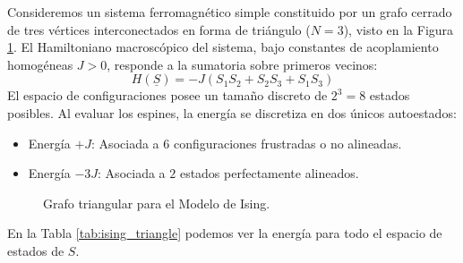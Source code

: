 \begin{ejemplo}
Consideremos un sistema ferromagnético simple constituido por un grafo cerrado de tres vértices interconectados en forma de triángulo ($N=3$), visto en la Figura \ref{fig:ising_triangle}. El Hamiltoniano macroscópico del sistema, bajo constantes de acoplamiento homogéneas $J > 0$, responde a la sumatoria sobre primeros vecinos:
\[
H(\underline{S}) = -J(S_1S_2 + S_2S_3 + S_1S_3)
\]
El espacio de configuraciones posee un tamaño discreto de $2^3 = 8$ estados posibles. Al evaluar los espines, la energía se discretiza en dos únicos autoestados:
\begin{itemize}
    \item Energía $+J$: Asociada a $6$ configuraciones frustradas o no alineadas.
    \item Energía $-3J$: Asociada a $2$ estados perfectamente alineados.
\end{itemize}

\begin{figure}[htbp] %
    \centering %
    \caption{Grafo triangular para el Modelo de Ising.} %
    \label{fig:ising_triangle} %
\end{figure}
En la Tabla \ref{tab:ising_triangle} podemos ver la energía para todo el espacio de estados de $S$.


\end{ejemplo}
